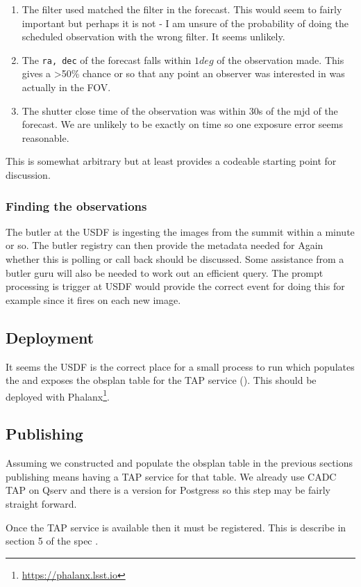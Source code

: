 \begin{enumerate}
\item The filter used matched the filter in the forecast.
This would seem to fairly important but perhaps it is not - I am unsure of the probability of
doing the scheduled observation with the wrong filter. It seems unlikely.
\item The \texttt {ra, dec} of the forecast falls within $1 deg$ of the observation made.
This gives a >50\% chance or so that any point an observer was interested in was actually in the FOV.
\item The shutter close time of the observation was within 30s of the mjd of the forecast.
We are unlikely to be exactly on time so one exposure error seems reasonable.
\end{enumerate}

This is somewhat arbitrary but at least provides a codeable starting point for discussion.

\subsubsection{Finding the observations}
The butler at the USDF is ingesting the images from the summit within a minute or so.
The butler registry can then provide the metadata needed for  
Again whether this is polling or call back should be discussed.
Some assistance from  a butler guru will also be needed to work out an efficient query.
The prompt processing is trigger at USDF would provide the correct event for doing this for example since it fires on each new image.

\subsection{Deployment}
It seems the USDF is the correct place for a small process to run which populates the \DB and exposes the obsplan table for the TAP service ().
This should be deployed with Phalanx\footnote{\url{https://phalanx.lsst.io}}.

\subsection{Publishing} \label{sec:tap}
Assuming we constructed and populate the obsplan table in the previous sections publishing means having a TAP service for that table.
We already use CADC TAP on Qserv and there is a version for Postgress so this step may be fairly straight forward.

Once the TAP service is available then it must be registered.
This is describe in section 5 of the spec \citep{2021ivoa.spec.0724S}.
